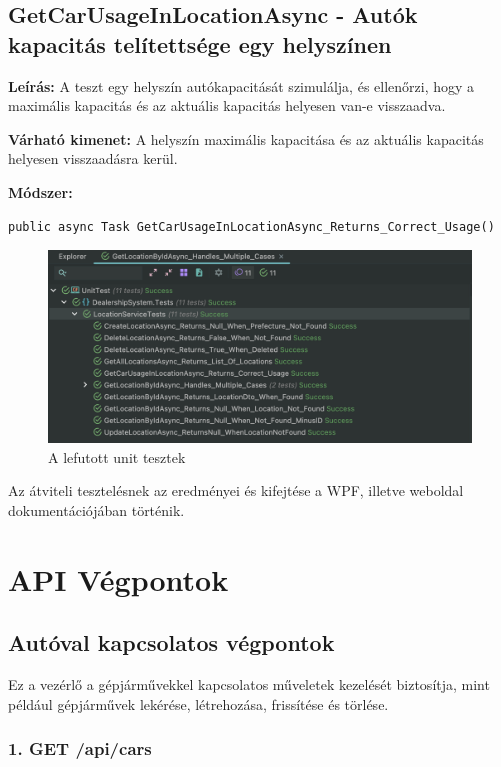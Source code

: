 \documentclass{report}[11pt]
\begin{document}
\subsection{GetCarUsageInLocationAsync - Autók kapacitás telítettsége egy helyszínen}
\textbf{Leírás:} A teszt egy helyszín autókapacitását szimulálja, és ellenőrzi, hogy a maximális kapacitás és az aktuális kapacitás helyesen van-e visszaadva.

\textbf{Várható kimenet:} A helyszín maximális kapacitása és az aktuális kapacitás helyesen visszaadásra kerül.

\textbf{Módszer:}
\begin{lstlisting}
public async Task GetCarUsageInLocationAsync_Returns_Correct_Usage()
\end{lstlisting}

\begin{figure}[H]
    \centering
    \includegraphics[width=1.0\textwidth]{figures/unittests.png} 
    \caption{A lefutott unit tesztek}
    \label{fig:unittest}
\end{figure}

Az átviteli tesztelésnek az eredményei és kifejtése a WPF, illetve weboldal dokumentációjában történik.

\section{API Végpontok}

\subsection{Autóval kapcsolatos végpontok}

Ez a vezérlő a gépjárművekkel kapcsolatos műveletek kezelését biztosítja, mint például gépjárművek lekérése, létrehozása, frissítése és törlése.

\subsubsection{1. GET /api/cars}
\end{document}
